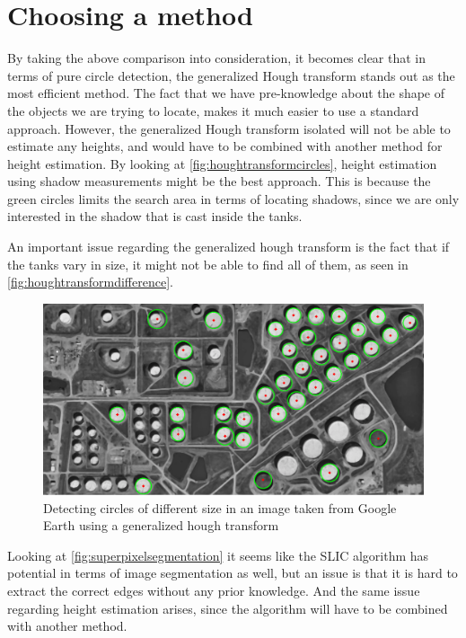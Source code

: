 \section{Choosing a method}
By taking the above comparison into consideration, it becomes clear that in terms of pure circle detection, the generalized Hough transform stands out as the most efficient method. The fact that we have pre-knowledge about the shape of the objects we are trying to locate, makes it much easier to use a standard approach. However, the generalized Hough transform isolated will not be able to estimate any heights, and would have to be combined with another method for height estimation. By looking at \autoref{fig:houghtransformcircles}, height estimation using shadow measurements might be the best approach. This is because the green circles limits the search area in terms of locating shadows, since we are only interested in the shadow that is cast inside the tanks.

An important issue regarding the generalized hough transform is the fact that if the tanks vary in size, it might not be able to find all of them, as seen in \autoref{fig:houghtransformdifference}.

\begin{figure}[!h]
	\centering
	\includegraphics[scale=0.35]{fig/hough_transform_difference.png}
	\caption{Detecting circles of different size in an image taken from Google Earth using a generalized hough transform}
	\label{fig:houghtransformdifference}
\end{figure}

Looking at \autoref{fig:superpixelsegmentation} it seems like the SLIC algorithm has potential in terms of image segmentation as well, but an issue is that it is hard to extract the correct edges without any prior knowledge. And the same issue regarding height estimation arises, since the algorithm will have to be combined with another method.

